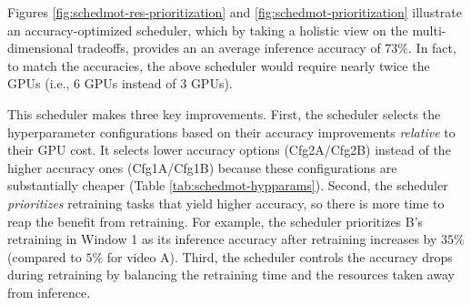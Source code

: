 Figures \ref{fig:schedmot-res-prioritization} and \ref{fig:schedmot-prioritization} illustrate an accuracy-optimized scheduler, which by taking a holistic view on the multi-dimensional tradeoffs, provides an an average inference accuracy of $73\%$. In fact, to match the accuracies, the above {\fair} scheduler would require nearly twice the GPUs (i.e., $6$ GPUs instead of $3$ GPUs). 

This scheduler makes three key improvements. First, the scheduler selects the hyperparameter configurations based on their accuracy improvements \emph{relative} to their GPU cost. It selects lower accuracy options ({\small Cfg2A/Cfg2B}) instead of the higher accuracy ones ({\small Cfg1A/Cfg1B}) because these configurations are substantially cheaper (Table \ref{tab:schedmot-hypparams}). 
Second, the scheduler \emph{prioritizes} retraining tasks that yield higher accuracy, so there is more time to reap the benefit from retraining. For example, the scheduler prioritizes B's retraining in Window 1 as its inference accuracy after retraining increases by $35\%$ (compared to $5\%$ for video A).
Third, the scheduler controls the accuracy drops during retraining by balancing the retraining time and the resources taken away from inference. %





